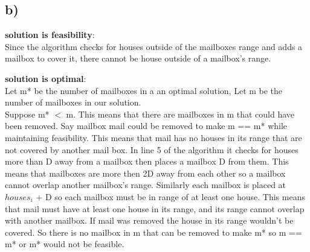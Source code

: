 \documentclass[12pt]{article}
\begin{document}
\subsection*{b)}
\textbf{solution is feasibility}:\\
    Since the algorithm checks for houses outside of the mailboxes range and adds a mailbox to cover it, there cannot be house outside of a mailbox's range.

\textbf{solution is optimal}:\\
    Let m* be the number of mailboxes in a an optimal solution, Let m be the number of mailboxes in our solution.\\
    Suppose m* $<$ m. This means that there are mailboxes in m that could have been removed. Say mailbox mail could be removed to make m == m* while maintaining feasibility. This means that mail has no houses in its range that are not covered by another mail box. In line 5 of the algorithm it checks for houses more than D away from a mailbox then places a mailbox D from them. This means that mailboxes are more then 2D away from each other so a mailbox cannot overlap another mailbox's range. Similarly each mailbox is placed at $houses_i$ + D so each mailbox must be in range of at least one house. This means that mail must have at least one house in its range, and its range cannot overlap with another mailbox. If mail was removed the house in its range wouldn't be covered. So there is no mailbox in m that can be removed to make m* so m == m* or m* would not be feasible.
\end{document}
